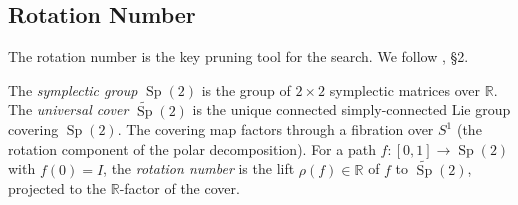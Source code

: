 \subsection{Rotation Number}\label{subsec:tube-rotation}

The rotation number is the key pruning tool for the search.
We follow \cite{CH2021}, \S 2.

\begin{definition}\label{def:rotation-number}
The \emph{symplectic group} $\operatorname{Sp}(2)$ is the group of
$2 \times 2$ symplectic matrices over $\mathbb{R}$.
The \emph{universal cover} $\widetilde{\operatorname{Sp}}(2)$ is the unique
connected simply-connected Lie group covering $\operatorname{Sp}(2)$.
The covering map factors through a fibration over $S^1$
(the rotation component of the polar decomposition).
For a path $f \colon [0,1] \to \operatorname{Sp}(2)$ with $f(0) = I$,
the \emph{rotation number} is the lift
$\rho(f) \in \mathbb{R}$ of $f$ to $\widetilde{\operatorname{Sp}}(2)$,
projected to the $\mathbb{R}$-factor of the cover.
\end{definition}

